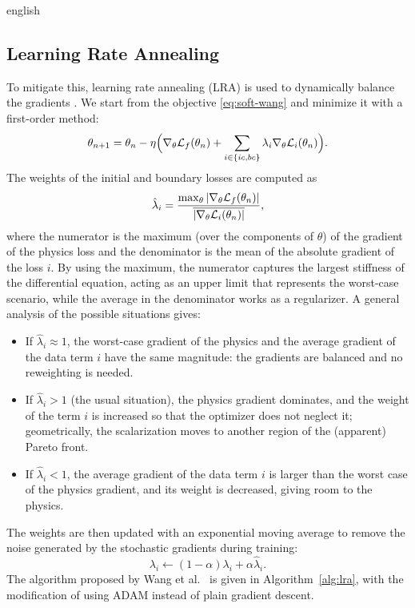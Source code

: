 \documentclass[../0000.tex]{subfiles}
\begin{document}
\begin{hyphenrules}{english}
\subsection{Learning Rate Annealing}\label{subsec:lra}

To mitigate this, learning rate annealing (LRA) is used to dynamically balance the gradients
\cite{wang2021gradient}. We start from the objective \eqref{eq:soft-wang} and minimize it with a
first-order method:
\begin{equation}
  \theta_{n+1}=\theta_n-\eta\Big(\nabla_\theta\mathcal{L}_f(\theta_n)+\sum_{i\in\{ic,bc\}}\lambda_i\nabla_\theta\mathcal{L}_i(\theta_n)\Big).
  \label{eq:lra-update}
\end{equation}
The weights of the initial and boundary losses are computed as
\begin{equation}
  \hat\lambda_i=\frac{\max_\theta\left\lvert \nabla_\theta\mathcal{L}_f(\theta_n) \right\rvert}{\overline{\left\lvert \nabla_\theta\mathcal{L}_i(\theta_n) \right\rvert}},
  \label{eq:lra-weights}
\end{equation}
where the numerator is the maximum (over the components of $\theta$) of the gradient of the physics loss
and the denominator is the mean of the absolute gradient of the loss $i$. By using the maximum, the numerator
captures the largest stiffness of the differential equation, acting as an upper limit that represents the
worst-case scenario, while the average in the denominator works as a regularizer. A general analysis of
the possible situations gives:
\begin{itemize}
  \item If $\hat\lambda_i\approx1$, the worst-case gradient of the physics and the average gradient of
    the data term $i$ have the same magnitude: the gradients are balanced and no reweighting is needed.
  \item If $\hat\lambda_i>1$ (the usual situation), the physics gradient dominates, and the weight of
    the term $i$ is increased so that the optimizer does not neglect it; geometrically, the
    scalarization moves to another region of the (apparent) Pareto front.
  \item If $\hat\lambda_i<1$, the average gradient of the data term $i$ is larger than the worst case of
    the physics gradient, and its weight is decreased, giving room to the physics.
\end{itemize}
The weights are then updated with an exponential moving average to remove the noise generated by the
stochastic gradients during training:
\begin{equation}
  \lambda_i\leftarrow(1-\alpha)\lambda_i+\alpha\hat\lambda_i.
  \label{eq:lra-ema}
\end{equation}
The algorithm proposed by Wang et al.~\cite{wang2021gradient} is given in Algorithm~\ref{alg:lra}, with the modification
of using ADAM instead of plain gradient descent.


\end{hyphenrules}
\end{document}
